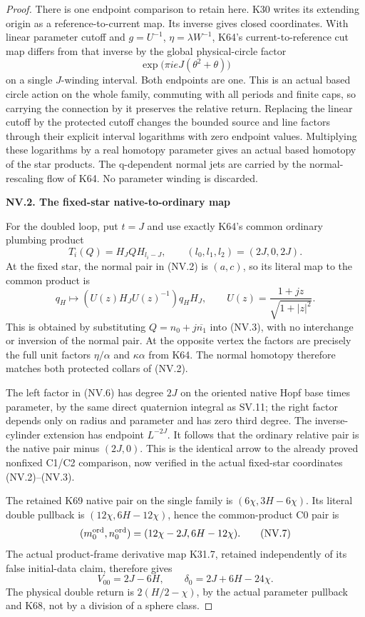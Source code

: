 \begin{proof}
There is one endpoint comparison to retain here. K30 writes its
extending origin as a reference-to-current map. Its inverse gives
closed coordinates. With linear parameter cutoff and \(g=U^{-1}\),
\(\eta=\lambda W^{-1}\), K64's current-to-reference cut map differs
from that inverse by the global physical-circle factor
\[
 \exp\bigl(\pi i eJ(\theta^2+\theta)\bigr)
\tag{NV.4}
\]
on a single \(J\)-winding interval. Both endpoints are one. This is
an actual based circle action on the whole family, commuting with all
periods and finite caps, so carrying the connection by it preserves
the relative return. Replacing the linear cutoff by the protected
cutoff changes the bounded source and line factors through their
explicit interval logarithms with zero endpoint values. Multiplying
these logarithms by a real homotopy parameter gives an actual based
homotopy of the star products. The q-dependent normal jets are carried
by the normal-rescaling flow of K64. No parameter winding is discarded.

\par

\medskip\noindent\textbf{NV.2. The fixed-star native-to-ordinary map}

\par\nobreak

For the doubled loop, put \(t=J\) and use exactly K64's common
ordinary plumbing product
\[
 T_i(Q)=H_JQH_{l_i-J},\qquad(l_0,l_1,l_2)=(2J,0,2J).
\tag{NV.5}
\]
At the fixed star, the normal pair in (NV.2) is \((a,c)\), so its
literal map to the common product is
\[
 q_H\longmapsto (U(z)H_JU(z)^{-1})q_HH_J,
 \qquad U(z)=\frac{1+jz}{\sqrt{1+|z|^2}}.
\tag{NV.6}
\]
This is obtained by substituting \(Q=n_0+j\overline{n_1}\) into
(NV.3), with no interchange or inversion of the normal pair.
At the opposite vertex the factors are precisely the full unit
factors \(\eta/\alpha\) and \(\kappa\alpha\) from K64. The
normal homotopy therefore matches both protected collars of (NV.2).

The left factor in (NV.6) has degree \(2J\) on the oriented native
Hopf base times parameter, by the same direct quaternion integral as
SV.11; the right factor depends only on radius and parameter and has
zero third degree. The inverse-cylinder extension has endpoint
\(L^{-2J}\). It follows that the ordinary relative pair is the
native pair minus \((2J,0)\). This is the identical arrow to the
already proved nonfixed C1/C2 comparison, now verified in the actual
fixed-star coordinates (NV.2)--(NV.3).

The retained K69 native pair on the single family is
\((6\chi,3H-6\chi)\). Its literal double pullback is
\((12\chi,6H-12\chi)\), hence the common-product C0 pair is
\[
 (m_0^{\rm ord},n_0^{\rm ord})
       =(12\chi-2J,6H-12\chi).
\tag{NV.7}
\]
The actual product-frame derivative map K31.7, retained independently
of its false initial-data claim, therefore gives
\[
 V_{00}=2J-6H,\qquad \delta_0=2J+6H-24\chi.
\tag{NV.8}
\]
The physical double return is \(2(H/2-\chi)\), by the actual
parameter pullback and K68, not by a division of a sphere class.


\end{proof}
